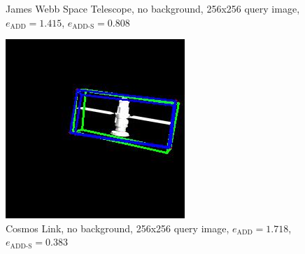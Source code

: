 \begin{figure}[h]
\begin{minipage}{0.45\linewidth}
        \caption{James Webb Space Telescope, no background, 256x256 query image, $e_\mathrm{ADD}=1.415$, $e_{\mathrm{ADD}\text{-}\mathrm{S}}=0.808$ }
        \label{fig:fig4}
    \end{minipage}
\end{figure}

\begin{figure}[h]
    \centering
    \begin{minipage}{0.45\linewidth}
        \centering
        \includegraphics[width=\linewidth]{data/fig5.jpg} %
        \caption{Cosmos Link, no background, 256x256 query image, $e_\mathrm{ADD}=1.718$, $e_{\mathrm{ADD}\text{-}\mathrm{S}}=0.383$ }
        \label{fig:fig5}
    \end{minipage}\hfill
    \begin{minipage}{0.45\linewidth}
        \centering

\end{minipage}
\end{figure}
